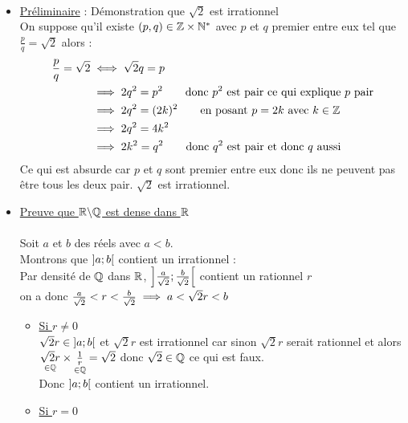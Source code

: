 \begin{dem} ~\\
    \begin{itemize}
        \item \underline{Préliminaire} : Démonstration que \(\sqrt{2}\) est irrationnel\\
        On suppose qu'il existe \((p,q) \in \mathbb{Z}\times\mathbb{N}^* \) avec \(p\) et \(q\) premier entre eux tel que \(\frac{p}{q} = \sqrt{2}\) alors : 
        \begin{align*}
            \frac{p}{q} = \sqrt{2} &\iff \sqrt{2}q = p \\
            &\implies 2q^2 = p^2 \qquad \text{donc } p^2 \text{ est pair ce qui explique } p \text{ pair}\\
            &\implies 2q^2 = (2k)^2 \qquad \text{en posant } p =2k \text{ avec } k \in \mathbb{Z} \\
            &\implies 2q^2 = 4k^2 \\
            &\implies 2k^2 = q^2 \qquad \text{donc } q^2 \text{ est pair et donc } q \text{ aussi} 
        \end{align*}
        Ce qui est absurde car \(p\) et \(q\) sont premier entre eux donc ils ne peuvent pas être tous les deux pair.
        \conclusion \(\sqrt{2}\) est irrationnel.
        \item \underline{Preuve que \(\mathbb{R}\backslash\mathbb{Q}\) est dense dans \(\mathbb{R}\)} \\~\\
        Soit \(a\) et \(b\) des réels avec \(a<b\).\\
        Montrons que \(\left]a;b\right[\) contient un irrationnel :\\
        Par densité de \(\mathbb{Q}\) dans \(\mathbb{R}\), \(\left]\frac{a}{\sqrt{2}};\frac{b}{\sqrt{2}}\right[\) contient un rationnel \(r\)\\
        on a donc \(\frac{a}{\sqrt{2}}<r<\frac{b}{\sqrt{2}} \implies a<\sqrt{2}r<b\)
        \begin{itemize}
            \item \underline{Si \(r\neq 0\)}\\
            \(\sqrt{2}r \in \left]a;b\right[\) et \(\sqrt{2}r\) est irrationnel car sinon \(\sqrt{2}r\) serait rationnel et alors \(\underset{\in \mathbb{Q}}{\sqrt{2}r} \times \underset{\in \mathbb{Q}}{\frac{1}{r}} = \sqrt{2}\) donc \(\sqrt{2} \in \mathbb{Q}\) ce qui est faux.\\
            Donc \(\left]a;b\right[\) contient un irrationnel.
            \item \underline{Si \(r = 0\)}\\

\end{itemize}
\end{itemize}
\end{dem}
